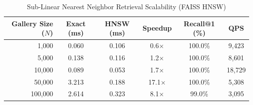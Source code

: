 \begin{table}[t]
\centering
\caption{Sub-Linear Nearest Neighbor Retrieval Scalability (FAISS HNSW)}
\label{tab:ann_scale}
\begin{tabular}{rccccc}
\hline
Gallery Size ($N$) & Exact (ms) & HNSW (ms) & Speedup & Recall@1 (\%) & QPS \\
\hline
1,000 & 0.060 & 0.106 & 0.6$\times$ & 100.0\% & 9,423 \\
5,000 & 0.138 & 0.116 & 1.2$\times$ & 100.0\% & 8,601 \\
10,000 & 0.089 & 0.053 & 1.7$\times$ & 100.0\% & 18,729 \\
50,000 & 3.213 & 0.188 & 17.1$\times$ & 100.0\% & 5,308 \\
100,000 & 2.614 & 0.323 & 8.1$\times$ & 99.0\% & 3,095 \\
\hline
\end{tabular}
\end{table}
